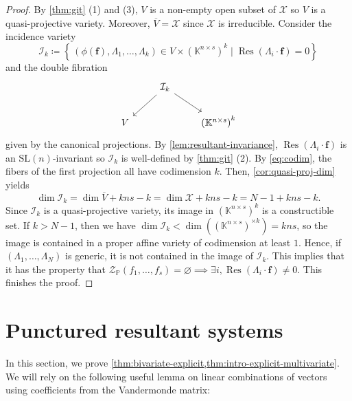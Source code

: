 \documentclass[11pt,a4paper]{article}
\numberwithin{equation}{section}
\newcommand{\PP}{\mathbb{P}}
\newcommand{\KK}{\mathbb{K}}
\newcommand{\cX}{\mathcal{X}}
\newcommand{\cZ}{\mathcal{Z}}
\newcommand{\cI}{\mathcal{I}}
\newcommand{\ff}{\ensuremath{\boldsymbol{f}}}
\newcommand{\SL}{\mathrm{SL}}
\DeclareMathOperator{\Res}{Res}
\begin{document}
\begin{proof}
By \cref{thm:git} (1) and (3), $V$ is a non-empty open subset of $\cX$ so $V$ is a quasi-projective variety.
Moreover, $\overline{V}=\cX$ since $\cX$ is irreducible.
Consider the incidence variety \[
    \cI_k\coloneqq \left\{\, (\phi(\ff) ,\Lambda_1,\dots,\Lambda_k) \in V \times \left(\KK^{n\times s}\right)^{k} \mid \Res(\Lambda_i\cdot\ff)=0\right\}
    \] and the double fibration
        \[
	\begin{tikzcd}
	& \cI_k \arrow[dl] \arrow[dr] & \\
	V && \left(\KK^{n\times s}\right)^k
	\end{tikzcd}
	\]
given by the canonical projections.
    By \cref{lem:resultant-invariance}, $\Res(\Lambda_i\cdot\ff)$ is an $\SL(n)$-invariant so $\cI_k$ is well-defined by \cref{thm:git} (2).
    By \eqref{eq:codim}, the fibers of the first projection all have codimension $k$.
    Then, \cref{cor:quasi-proj-dim} yields \[
    \dim \cI_k = \dim\overline{V} + kns-k=\dim\cX+kns-k=N-1+kns-k.
    \] 
    Since $\cI_k$ is a quasi-projective variety, its image in $(\KK^{n\times s})^k$ is a constructible set.
    If $k>N-1$, then we have $\dim \cI_k < \dim \left((\KK^{n\times s})^{\times k}\right)=kns$, so the image is contained in a proper affine variety of codimension at least $1$.
    Hence, if $(\Lambda_1,\dots,\Lambda_{N})$ is generic, it is not contained in the image of $\cI_k$.
    This implies that it has the property that $\cZ_{\PP}(f_1,\dots,f_s)=\varnothing\implies\exists i, \Res(\Lambda_i\cdot \ff)\neq 0$.
    This finishes the proof.
\end{proof}

\section{Punctured resultant systems}
\label{sec:multiproj}
In this section, we prove \cref{thm:bivariate-explicit,thm:intro-explicit-multivariate}.
We will rely on the following useful lemma on linear combinations of vectors using coefficients from the Vandermonde matrix:
\end{document}
